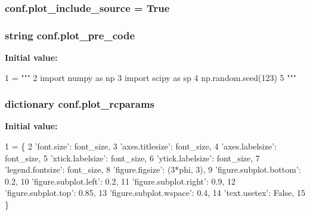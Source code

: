 \subsubsection[{plot\+\_\+include\+\_\+source}]{\setlength{\rightskip}{0pt plus 5cm}conf.\+plot\+\_\+include\+\_\+source = {\bf True}}\label{namespaceconf_a5e2e05a50752b8f166612fe843188c5d}
\hypertarget{namespaceconf_a7951284e1e80d61ad717b9345f2b9c6f}{}
\subsubsection[{plot\+\_\+pre\+\_\+code}]{\setlength{\rightskip}{0pt plus 5cm}string conf.\+plot\+\_\+pre\+\_\+code}\label{namespaceconf_a7951284e1e80d61ad717b9345f2b9c6f}
{\bfseries Initial value\+:}
\begin{DoxyCode}
1 = \textcolor{stringliteral}{"""}
2 \textcolor{stringliteral}{import numpy as np}
3 \textcolor{stringliteral}{import scipy as sp}
4 \textcolor{stringliteral}{np.random.seed(123)}
5 \textcolor{stringliteral}{"""}
\end{DoxyCode}
\hypertarget{namespaceconf_af2b068506b37ff5b4bed655c96c5ffa5}{}
\subsubsection[{plot\+\_\+rcparams}]{\setlength{\rightskip}{0pt plus 5cm}dictionary conf.\+plot\+\_\+rcparams}\label{namespaceconf_af2b068506b37ff5b4bed655c96c5ffa5}
{\bfseries Initial value\+:}
\begin{DoxyCode}
1 = \{
2     \textcolor{stringliteral}{'font.size'}: font\_size,
3     \textcolor{stringliteral}{'axes.titlesize'}: font\_size,
4     \textcolor{stringliteral}{'axes.labelsize'}: font\_size,
5     \textcolor{stringliteral}{'xtick.labelsize'}: font\_size,
6     \textcolor{stringliteral}{'ytick.labelsize'}: font\_size,
7     \textcolor{stringliteral}{'legend.fontsize'}: font\_size,
8     \textcolor{stringliteral}{'figure.figsize'}: (3*phi, 3),
9     \textcolor{stringliteral}{'figure.subplot.bottom'}: 0.2,
10     \textcolor{stringliteral}{'figure.subplot.left'}: 0.2,
11     \textcolor{stringliteral}{'figure.subplot.right'}: 0.9,
12     \textcolor{stringliteral}{'figure.subplot.top'}: 0.85,
13     \textcolor{stringliteral}{'figure.subplot.wspace'}: 0.4,
14     \textcolor{stringliteral}{'text.usetex'}: \textcolor{keyword}{False},
15 \}
\end{DoxyCode}
\hypertarget{namespaceconf_ab3a89593e7b7c63c11c3921f4f2aad4d}{}
